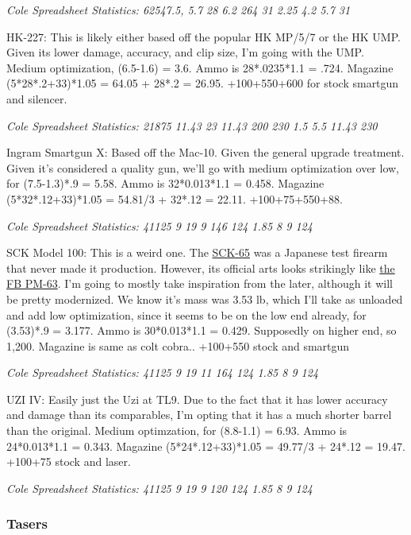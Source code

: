 \begin{multicols*}{2}
	\textit{\textcolor{OliveGreen}{Cole Spreadsheet Statistics:  62547.5, 5.7 28 6.2 264 31 2.25 4.2 5.7 31}}
	
	HK-227: This is likely either based off the popular HK MP/5/7 or the HK UMP. Given its lower damage, accuracy, and clip size, I'm going with the UMP. Medium optimization, (6.5-1.6) = 3.6. Ammo is 28*.0235*1.1 = .724. Magazine (5*28*.2+33)*1.05 = 64.05 + 28*.2 = 26.95. +100+550+600 for stock smartgun and silencer.
	
	\textit{\textcolor{OliveGreen}{Cole Spreadsheet Statistics: 21875 11.43 23 11.43 200 230 1.5 5.5 11.43 230}}
	
	Ingram Smartgun X: Based off the Mac-10. Given the general upgrade treatment. Given it's considered a quality gun, we'll go with medium optimization over low, for (7.5-1.3)*.9 = 5.58. Ammo is 32*0.013*1.1 = 0.458. Magazine (5*32*.12+33)*1.05 = 54.81/3 + 32*.12 = 22.11. +100+75+550+88.
	
	\textit{\textcolor{OliveGreen}{Cole Spreadsheet Statistics: 41125 9 19 9 146 124 1.85 8 9 124}}
	
	SCK Model 100: This is a weird one. The \textcolor{Blue}{\href{https://en.wikipedia.org/wiki/New_Nambu_M66}{SCK-65}} was a Japanese test firearm that never made it production. However, its official arts looks strikingly like \textcolor{Blue}{\href{https://en.wikipedia.org/wiki/FB_PM-63}{the FB PM-63}}. I'm going to mostly take inspiration from the later, although it will be pretty modernized. We know it's mass was 3.53 lb, which I'll take as unloaded and add low optimization, since it seems to be on the low end already, for (3.53)*.9 = 3.177. Ammo is 30*0.013*1.1 = 0.429. Supposedly on higher end, so 1,200. Magazine is same as colt cobra.. +100+550 stock and smartgun
	
	\textit{\textcolor{OliveGreen}{Cole Spreadsheet Statistics: 41125 9 19 11 164 124 1.85 8 9 124}}
	
	UZI IV: Easily just the Uzi at TL9. Due to the fact that it has lower accuracy and damage than its comparables, I'm opting that it has a much shorter barrel than the original. Medium optimzation, for (8.8-1.1) = 6.93. Ammo is 24*0.013*1.1 = 0.343. Magazine (5*24*.12+33)*1.05 = 49.77/3 + 24*.12 = 19.47. +100+75 stock and laser.
	
	\textit{\textcolor{OliveGreen}{Cole Spreadsheet Statistics: 41125 9 19 9 120 124 1.85 8 9 124}}
	
	\subsubsection{Tasers}
	

\end{multicols*}
